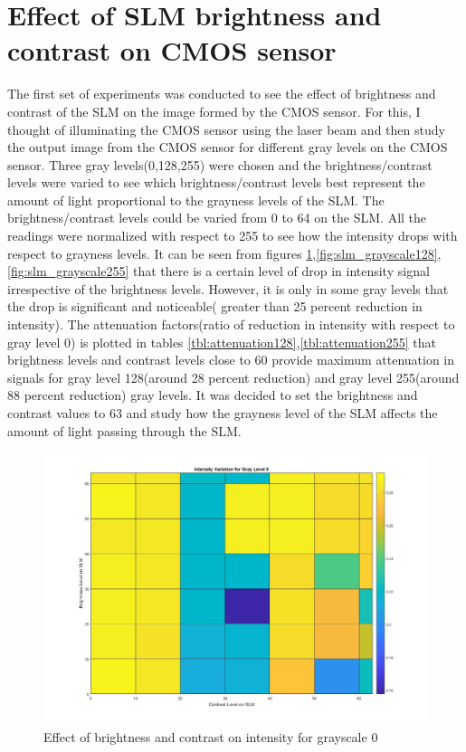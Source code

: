 \section{Effect of SLM brightness and contrast on CMOS sensor}
The first set of experiments was conducted to see the effect of brightness and contrast of the SLM on the image formed by the CMOS sensor. For this, I thought of illuminating the CMOS sensor using the laser beam and then study the output image from the CMOS sensor for different gray levels on the CMOS sensor. Three gray levels(0,128,255) were chosen and the brightness/contrast levels were varied to see which brightness/contrast levels best represent the amount of light proportional to the grayness levels of the SLM. The brightness/contrast levels could be varied from 0 to 64 on the SLM. All the readings were normalized with respect to 255 to see how the intensity drops with respect to grayness levels. It can be seen from figures \ref{fig:slm_grayscale0},\ref{fig:slm_grayscale128},\ref{fig:slm_grayscale255} that there is a certain level of drop in intensity signal irrespective of the brightness levels. However, it is only in some gray levels that the drop is significant and noticeable( greater than 25 percent reduction in intensity). The attenuation factors(ratio of reduction in intensity with respect to gray level 0) is plotted in tables \ref{tbl:attenuation128},\ref{tbl:attenuation255} that brightness levels and contrast levels close to 60 provide maximum attenuation in signals for gray level 128(around 28 percent reduction) and gray level 255(around 88 percent reduction) gray levels. It was decided to set the brightness and contrast values to 63 and study how the grayness level of the SLM affects the amount of light passing through the SLM.
\begin{figure}[h]
\centering
\includegraphics[width = \linewidth]{pics/slm/slmgrayscale0.jpg}
\caption{Effect of brightness and contrast on intensity for grayscale 0}
\label{fig:slm_grayscale0}
\end{figure}
